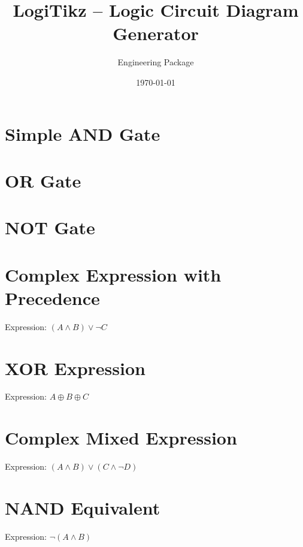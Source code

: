\documentclass{article}
\title{LogiTikz -- Logic Circuit Diagram Generator}
\author{Engineering Package}
\date{\today}
\begin{document}
\maketitle

\section{Simple AND Gate}
\begin{center}
\end{center}

\section{OR Gate}
\begin{center}
\end{center}

\section{NOT Gate}
\begin{center}
\end{center}

\section{Complex Expression with Precedence}
Expression: $(A \land B) \lor \neg C$
\begin{center}
\end{center}

\section{XOR Expression}
Expression: $A \oplus B \oplus C$
\begin{center}
\end{center}

\section{Complex Mixed Expression}
Expression: $(A \land B) \lor (C \land \neg D)$
\begin{center}
\end{center}

\section{NAND Equivalent}
Expression: $\neg(A \land B)$
\begin{center}
\end{center}
\end{document}

